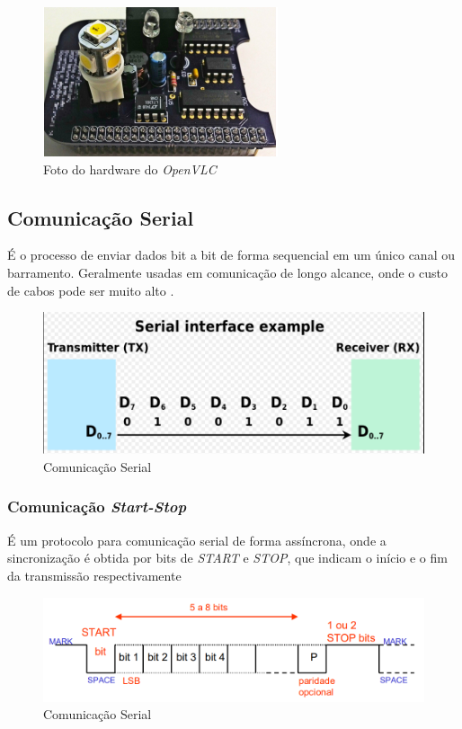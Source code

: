 \begin{figure}[!htbp]
    \caption{Foto do hardware do \textit{OpenVLC}} \label{fig_minipage_imagem1}
    \includegraphics[scale=0.9]{images/Cape.png}
\end{figure}

\subsection{Comunicação Serial}

É o processo de enviar dados bit a bit de forma sequencial em um único canal ou barramento. Geralmente usadas em comunicação de longo alcance, onde o custo de cabos pode ser muito alto \cite{wikipedia2023}.

\begin{figure}[!htbp]
    \caption{Comunicação Serial} \label{comunicacao_serial}
    \includegraphics[scale=0.4]{images/comunicacao_serial.png}
\end{figure}

\subsubsection{Comunicação \textit{Start-Stop}}

É um protocolo para comunicação serial de forma assíncrona, onde a sincronização é obtida por bits de \emph{START} e \emph{STOP}, que indicam o início e o fim da transmissão respectivamente \cite{comunicaoSerial}

\begin{figure}[!htbp]
    \caption{Comunicação Serial} \label{proto_start_stop}
    \includegraphics[scale=0.5]{images/proto_start_stop.png}
\end{figure}

